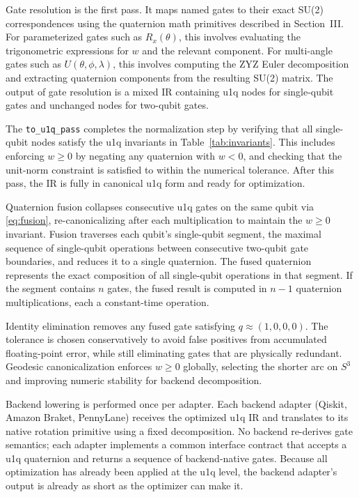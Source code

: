 \documentclass[conference]{IEEEtran}
\begin{document}
Gate resolution is the first pass. It maps named gates to their exact SU(2)
correspondences using the quaternion math primitives described in Section~III. For
parameterized gates such as $R_x(\theta)$, this involves evaluating the trigonometric
expressions for $w$ and the relevant component. For multi-angle gates such as
$U(\theta, \phi, \lambda)$, this involves computing the ZYZ Euler decomposition and
extracting quaternion components from the resulting SU(2) matrix. The output of gate
resolution is a mixed IR containing u1q nodes for single-qubit gates and unchanged nodes
for two-qubit gates.

The \texttt{to\_u1q\_pass} completes the normalization step by verifying that all
single-qubit nodes satisfy the u1q invariants in Table~\ref{tab:invariants}. This
includes enforcing $w \geq 0$ by negating any quaternion with $w < 0$, and checking
that the unit-norm constraint is satisfied to within the numerical tolerance. After this
pass, the IR is fully in canonical u1q form and ready for optimization.

Quaternion fusion collapses consecutive u1q gates on the same qubit via
\eqref{eq:fusion}, re-canonicalizing after each multiplication to maintain the $w \geq 0$
invariant. Fusion traverses each qubit's single-qubit segment, the maximal sequence
of single-qubit operations between consecutive two-qubit gate boundaries, and reduces
it to a single quaternion. The fused quaternion represents the exact composition of all
single-qubit operations in that segment. If the segment contains $n$ gates, the fused
result is computed in $n-1$ quaternion multiplications, each a constant-time operation.

Identity elimination removes any fused gate satisfying $q \approx (1, 0, 0, 0)$. The
tolerance is chosen conservatively to avoid false positives from accumulated floating-point
error, while still eliminating gates that are physically redundant. Geodesic canonicalization
enforces $w \geq 0$ globally, selecting the shorter arc on $S^3$ and improving numeric
stability for backend decomposition.

Backend lowering is performed once per adapter. Each backend adapter (Qiskit, Amazon
Braket, PennyLane) receives the optimized u1q IR and translates to its native rotation
primitive using a fixed decomposition. No backend re-derives gate semantics; each adapter
implements a common interface contract that accepts a u1q quaternion and returns a sequence
of backend-native gates. Because all optimization has already been applied at the u1q level,
the backend adapter's output is already as short as the optimizer can make it.
\end{document}
